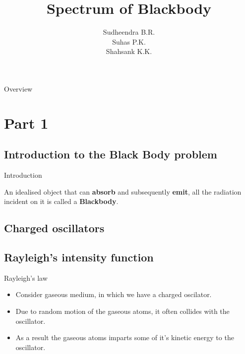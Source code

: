 \documentclass[aspectratio=169]{beamer}
\title{Spectrum of Blackbody}
\institute{{\footnotesize Guided by V.H. Belvadi} \\ Yuvaraja's College, Mysuru}
\author{Sudheendra B.R. \\ Suhas P.K. \\ Shahsank K.K.}
\date{}
\newcommand{\highlight}[1]{\textbf{#1}}
\begin{document}
\begin{frame}[noframenumbering]
	\titlepage
\end{frame}

\begin{frame}[noframenumbering]{Overview}

		\tableofcontents[sections={1}] 
		
\end{frame}

\begin{frame}

		\tableofcontents[sections={2-3}]
		 
\end{frame}


\section{Part 1}

\subsection{Introduction to the Black Body problem}

\begin{frame}{Introduction}

{\large An idealised object that can \highlight{absorb} and subsequently \highlight{emit}, all the radiation incident on it is called a \highlight{Blackbody}.}

\end{frame}

\subsection{Charged oscillators}
 
\subsection{Rayleigh's intensity function}

\begin{frame}{Rayleigh's law}

	\begin{itemize}
		
		\item Consider gaseous medium, in which we have a charged oscilator. \newline
		\item Due to random motion of the gaseous atoms, it often collides with the oscillator. \pause \newline
		\item As a result the gaseous atoms imparts some of it's kinetic energy to the oscillator.
		
	\end{itemize}
	
\end{frame}
\end{document}
